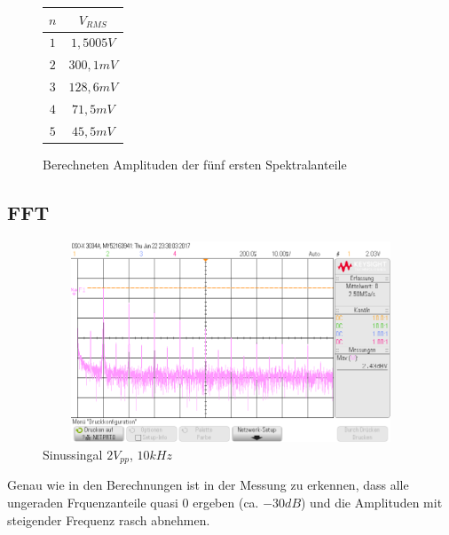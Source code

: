 \begin{figure}[H]
  \begin{center}
    \begin{tabular}{|c|c|} \hline
    $n$ & $V_{RMS}$ \\ \hline
    $1$ & $1,5005V$ \\ \hline
    $2$ & $300,1mV$ \\ \hline
    $3$ & $128,6mV$ \\ \hline
    $4$ & $71,5mV$ \\ \hline
    $5$ & $45,5mV$ \\ \hline
    \end{tabular}
  \end{center}
  \caption{Berechneten Amplituden der f\"unf ersten Spektralanteile} \label{bsp4_SpecCalc}
\end{figure}



\subsection{FFT}
\begin{figure}[H]
 \begin{center}
  \includegraphics[height=6cm,width=12cm]{OsziBilder/bsp4_sin_fft_10Vpp_dB.png}
 \end{center}
 \caption{Sinussingal $2V_{pp}$, $10kHz$}\label{bsp4_fft}
\end{figure}
\noindent
Genau wie in den Berechnungen ist in der Messung zu erkennen, dass alle ungeraden Frquenzanteile quasi 0 ergeben (ca. $-30dB$) und die Amplituden mit steigender Frequenz rasch abnehmen.

